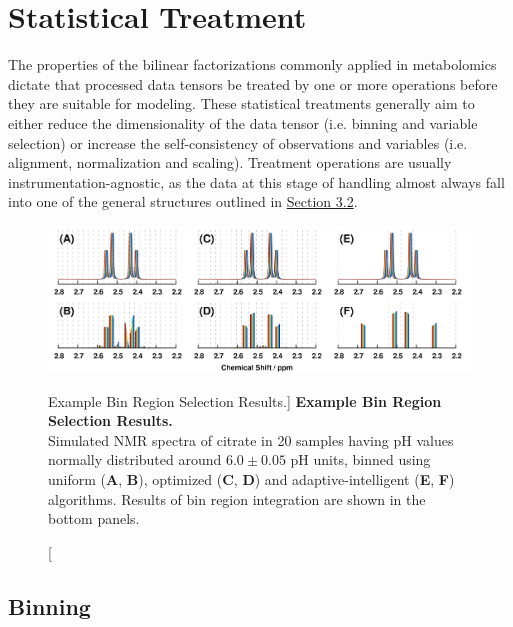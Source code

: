 \section{Statistical Treatment}

\begin{doublespace}
The properties of the bilinear factorizations commonly applied in metabolomics
dictate that processed data tensors be treated by one or more operations before
they are suitable for modeling. These statistical treatments generally aim to
either reduce the dimensionality of the data tensor (i.e. binning and variable
selection) or increase the self-consistency of observations and variables
(i.e. alignment, normalization and scaling). Treatment operations are usually
instrumentation-agnostic, as the data at this stage of handling almost always
fall into one of the general structures outlined in
\hyperlink{section.3.2}{Section 3.2}.
\end{doublespace}

\begin{figure}[ht!]
\includegraphics[width=6.5in]{figs/mva/05-binning.png}
\caption
      [Example Bin Region Selection Results.]{
  {\bf Example Bin Region Selection Results.}
  \\
  Simulated \hnmr{} NMR spectra of citrate in 20 samples having pH values
  normally distributed around $6.0 \pm 0.05$ pH units, binned using uniform
  ({\bf A}, {\bf B}), optimized ({\bf C}, {\bf D}) and adaptive-intelligent
  ({\bf E}, {\bf F}) algorithms. Results of bin region integration are shown
  in the bottom panels.
}
\label{figure.3.5}
\end{figure}

\subsection{Binning}


